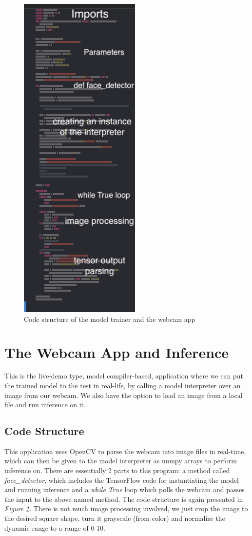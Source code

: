 \begin{figure}
    \includegraphics[height = 18 cm]{images/code_body_xcode_webcam.png}
    \caption{Code structure of the model trainer and the webcam app}
    \label{xcode_struct}
\end{figure}

\section{The Webcam App and Inference}
This is the live-demo type, model compiler-based, application where we can put the trained model to the test in real-life, by calling a model interpreter over an image from our webcam. We also have the option to load an image from a local file and run inference on it. 
\subsection{Code Structure}
This application uses OpenCV to parse the webcam into image files in real-time, which can then be given to the model interpreter as numpy arrays to perform inference on. There are essentially 2 parts to this program: a method called \textit{face\_detector}, which includes the TensorFlow code for instantiating the model and running inference and a \textit{while True} loop which polls the webcam and passes the input to the above named method. The code structure is again presented in \textit{Figure \ref{xcode_struct}}. There is not much image processing involved, we just crop the image to the desired square shape, turn it grayscale (from color) and normalize the dynamic range to a range of 0-10.
